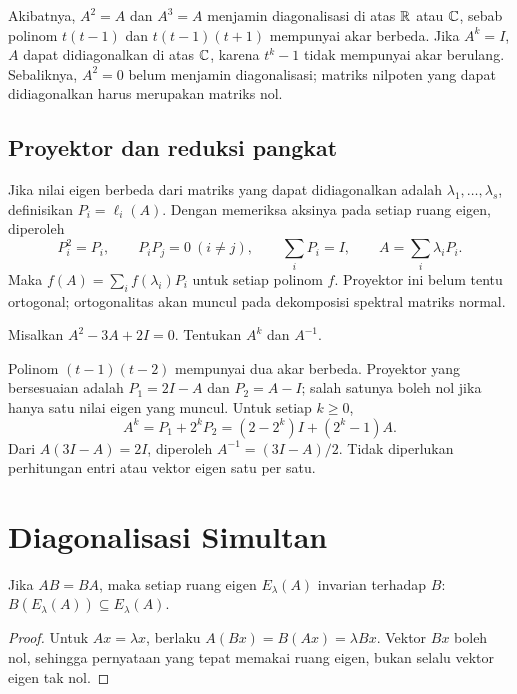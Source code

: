 Akibatnya, $A^2=A$ dan $A^3=A$ menjamin diagonalisasi di atas $\mathbb{R}$
atau $\mathbb{C}$, sebab polinom $t(t-1)$ dan $t(t-1)(t+1)$ mempunyai akar
berbeda. Jika $A^k=I$, $A$ dapat didiagonalkan di atas $\mathbb{C}$, karena
$t^k-1$ tidak mempunyai akar berulang.
Sebaliknya, $A^2=0$ belum menjamin diagonalisasi; matriks nilpoten
yang dapat didiagonalkan harus merupakan matriks nol.

\subsection{Proyektor dan reduksi pangkat}

Jika nilai eigen berbeda dari matriks yang dapat didiagonalkan adalah
$\lambda_1,\ldots,\lambda_s$, definisikan $P_i=\ell_i(A)$.
Dengan memeriksa aksinya pada setiap ruang eigen, diperoleh
\[
    P_i^2=P_i,\qquad P_iP_j=0\ (i\ne j),\qquad
    \sum_iP_i=I,\qquad A=\sum_i\lambda_iP_i.
\]
Maka $f(A)=\sum_i f(\lambda_i)P_i$ untuk setiap polinom $f$.
Proyektor ini belum tentu ortogonal; ortogonalitas akan muncul pada
dekomposisi spektral matriks normal.

\begin{exam}
    Misalkan $A^2-3A+2I=0$. Tentukan $A^k$ dan $A^{-1}$.
\end{exam}
\begin{solution}
    Polinom $(t-1)(t-2)$ mempunyai dua akar berbeda.
    Proyektor yang bersesuaian adalah $P_1=2I-A$ dan $P_2=A-I$;
    salah satunya boleh nol jika hanya satu nilai eigen yang muncul.
    Untuk setiap $k\ge0$,
    \[
        A^k=P_1+2^kP_2=(2-2^k)I+(2^k-1)A.
    \]
    Dari $A(3I-A)=2I$, diperoleh $A^{-1}=(3I-A)/2$.
    Tidak diperlukan perhitungan entri atau vektor eigen satu per satu.
\end{solution}

\section{Diagonalisasi Simultan}
\label{eigen:komutatif}

\begin{prop}
    Jika $AB=BA$, maka setiap ruang eigen $E_\lambda(A)$ invarian
    terhadap $B$: $B(E_\lambda(A))\subseteq E_\lambda(A)$.
\end{prop}
\begin{proof}
    Untuk $Ax=\lambda x$, berlaku $A(Bx)=B(Ax)=\lambda Bx$.
    Vektor $Bx$ boleh nol, sehingga pernyataan yang tepat memakai
    ruang eigen, bukan selalu vektor eigen tak nol.
\end{proof}

